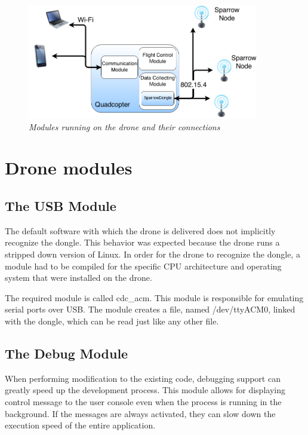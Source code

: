\begin{figure}[ht]
\begin{center}
\includegraphics[width=0.9\textwidth]{img/organigrama.png}
\end{center}
\caption{\small \itshape{Modules running on the drone and their connections}}
  \label{fig:arhitecture}
\end{figure}

\section{Drone modules}

\subsection{The USB Module}

The default software with which the drone is delivered does not implicitly recognize the dongle. This behavior was expected because the drone runs a stripped down version of Linux. In order for the drone to recognize the dongle, a module had to be compiled for the specific CPU architecture and operating system that were installed on the drone.

The required module is called cdc\_acm\cite{cdcacm}. This module is responsible for emulating serial ports over USB. The module creates a file, named /dev/ttyACM0, linked with the dongle, which can be read just like any other file.

\subsection{The Debug Module}
 
When performing modification to the existing code, debugging support can greatly speed up the development process. This module allows for displaying control message to the user console even when the process is running in the background. If the messages are always activated, they can slow down the execution speed of the entire application.

